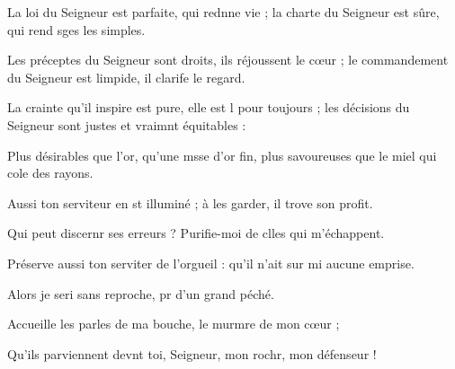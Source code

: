 \item La loi du Seigneur est parfaite, qui rednne vie ;\psstar{} la charte du Seigneur est sûre, qui rend sges les simples.
\item Les préceptes du Seigneur sont droits, ils réjoussent le cœur ;\psstar{} le commandement du Seigneur est limpide, il clarife le regard.
\item La crainte qu’il inspire est pure, elle est l pour toujours ;\psstar{} les décisions du Seigneur sont justes et vraimnt équitables :
\item Plus désirables que l’or, qu’une msse d’or fin,\psstar{} plus savoureuses que le miel qui cole des rayons.
\item Aussi ton serviteur en st illuminé ;\psstar{} à les garder, il trove son profit.
\item Qui peut discernr ses erreurs ?\psstar{} Purifie-moi de clles qui m’échappent.
\item Préserve aussi ton serviter de l’orgueil :\psstar{} qu’il n’ait sur mi aucune emprise.
\item Alors je seri sans reproche,\psstar{} pr d’un grand péché.
\item Accueille les parles de ma bouche,\psstar{} le murmre de mon cœur ;
\item Qu’ils parviennent devnt toi, Seigneur,\psstar{} mon rochr, mon défenseur !